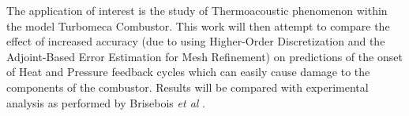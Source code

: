 The application of interest is the study of Thermoacoustic phenomenon within the model Turbomeca Combustor. This work will then attempt to compare the effect of increased accuracy (due to using Higher-Order Discretization and the Adjoint-Based Error Estimation for Mesh Refinement) on predictions of the onset of Heat and Pressure feedback cycles which can easily cause damage to the components of the combustor. Results will be compared with experimental analysis as performed by Brisebois \textit{et al} \cite{Brisebois:2014}. \par
